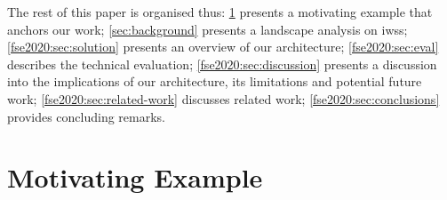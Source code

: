 




The rest of this paper is organised thus: \cref{fse2020:sec:motivation} presents a motivating example that anchors our work; \cref{sec:background} presents a landscape analysis on \glspl{iws}; \cref{fse2020:sec:solution} presents an overview of our architecture; \cref{fse2020:sec:eval} describes the technical evaluation; \cref{fse2020:sec:discussion} presents a discussion into the implications of our architecture, its limitations and potential future work; \cref{fse2020:sec:related-work} discusses related work; \cref{fse2020:sec:conclusions} provides concluding remarks.




\section{Motivating Example}
\label{fse2020:sec:motivation}

